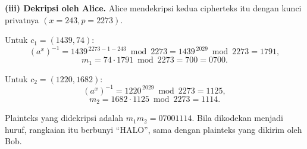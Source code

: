 \begin{example}[Pesan ``HALO'' dengan $p = 2273$]
\textbf{(iii) Dekripsi oleh Alice.} Alice mendekripsi kedua cipherteks itu
dengan kunci privatnya $(x = 243, p = 2273)$.

Untuk $c_{1} = (1439, 74)$:
\[
\left(a^{x}\right)^{-1} = 1439^{\,2273-1-243} \bmod 2273
= 1439^{\,2029} \bmod 2273 = 1791 ,
\]
\[ m_{1} = 74 \cdot 1791 \bmod 2273 = 700 = 0700 . \]

Untuk $c_{2} = (1220, 1682)$:
\[
\left(a^{x}\right)^{-1} = 1220^{\,2029} \bmod 2273 = 1125 ,
\]
\[ m_{2} = 1682 \cdot 1125 \bmod 2273 = 1114 . \]

Plainteks yang didekripsi adalah $m_{1} m_{2} = 07001114$. Bila dikodekan
menjadi huruf, rangkaian itu berbunyi ``HALO'', sama dengan plainteks yang
dikirim oleh Bob.
\end{example}
